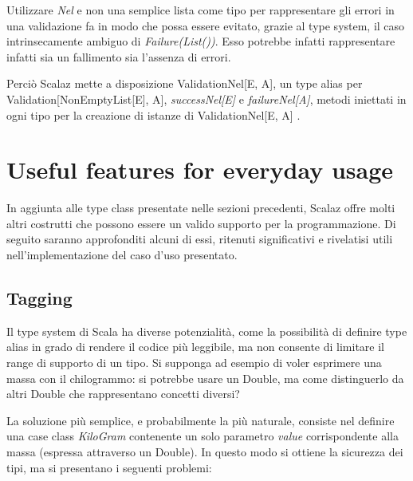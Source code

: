 

Utilizzare \textit{Nel} e non una semplice lista come tipo per rappresentare gli errori in una validazione fa in modo che possa essere evitato, grazie al type system, il caso intrinsecamente ambiguo di \textit{Failure(List())}. Esso potrebbe infatti rappresentare infatti sia un fallimento sia l'assenza di errori.

Perciò Scalaz mette a disposizione ValidationNel[E, A], un type alias per Validation[NonEmptyList[E], A], \textit{successNel[E]} e \textit{failureNel[A]}, metodi iniettati in ogni tipo per la creazione di istanze di ValidationNel[E, A] \cite{ValidationNel}.




\section{Useful features for everyday usage}

In aggiunta alle type class presentate nelle sezioni precedenti, Scalaz offre molti altri costrutti che possono essere un valido supporto per la programmazione. Di seguito saranno approfonditi alcuni di essi, ritenuti significativi e rivelatisi utili nell'implementazione del caso d'uso presentato.

\subsection{Tagging}

Il type system di Scala ha diverse potenzialità, come la possibilità di definire type alias in grado di rendere il codice più leggibile, ma non consente di limitare il range di supporto di un tipo. Si supponga ad esempio di voler esprimere una massa con il chilogrammo: si potrebbe usare un Double, ma come distinguerlo da altri Double che rappresentano concetti diversi?

La soluzione più semplice, e probabilmente la più naturale, consiste nel definire una case class \textit{KiloGram} contenente un solo parametro \textit{value} corrispondente alla massa (espressa attraverso un Double). In questo modo si ottiene la sicurezza dei tipi, ma si presentano i seguenti problemi:

